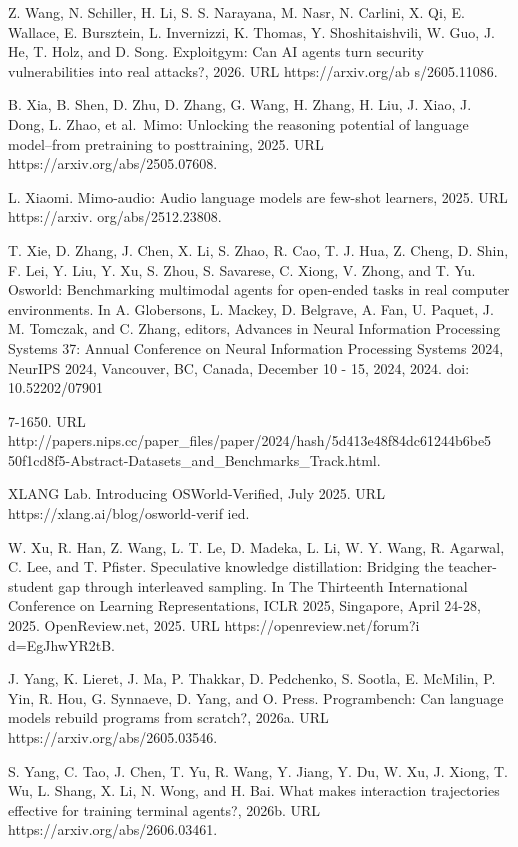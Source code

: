 \documentclass[
  10
]{article}
\begin{document}
Z. Wang, N. Schiller, H. Li, S. S. Narayana, M. Nasr, N. Carlini, X. Qi,
E. Wallace, E. Bursztein, L. Invernizzi, K. Thomas, Y. Shoshitaishvili,
W. Guo, J. He, T. Holz, and D. Song. Exploitgym: Can AI agents turn
security vulnerabilities into real attacks?, 2026. URL
https://arxiv.org/ab s/2605.11086.

B. Xia, B. Shen, D. Zhu, D. Zhang, G. Wang, H. Zhang, H. Liu, J. Xiao,
J. Dong, L. Zhao, et al.~Mimo: Unlocking the reasoning potential of
language model--from pretraining to posttraining, 2025. URL
https://arxiv.org/abs/2505.07608.

L. Xiaomi. Mimo-audio: Audio language models are few-shot learners,
2025. URL https://arxiv. org/abs/2512.23808.

T. Xie, D. Zhang, J. Chen, X. Li, S. Zhao, R. Cao, T. J. Hua, Z. Cheng,
D. Shin, F. Lei, Y. Liu, Y. Xu, S. Zhou, S. Savarese, C. Xiong, V.
Zhong, and T. Yu. Osworld: Benchmarking multimodal agents for open-ended
tasks in real computer environments. In A. Globersons, L. Mackey, D.
Belgrave, A. Fan, U. Paquet, J. M. Tomczak, and C. Zhang, editors,
Advances in Neural Information Processing Systems 37: Annual Conference
on Neural Information Processing Systems 2024, NeurIPS 2024, Vancouver,
BC, Canada, December 10 - 15, 2024, 2024. doi: 10.52202/07901



7-1650. URL
http://papers.nips.cc/paper\_files/paper/2024/hash/5d413e48f84dc61244b6be5
50f1cd8f5-Abstract-Datasets\_and\_Benchmarks\_Track.html.

XLANG Lab. Introducing OSWorld-Verified, July 2025. URL
https://xlang.ai/blog/osworld-verif ied.

W. Xu, R. Han, Z. Wang, L. T. Le, D. Madeka, L. Li, W. Y. Wang, R.
Agarwal, C. Lee, and T. Pfister. Speculative knowledge distillation:
Bridging the teacher-student gap through interleaved sampling. In The
Thirteenth International Conference on Learning Representations, ICLR
2025, Singapore, April 24-28, 2025. OpenReview.net, 2025. URL
https://openreview.net/forum?i d=EgJhwYR2tB.

J. Yang, K. Lieret, J. Ma, P. Thakkar, D. Pedchenko, S. Sootla, E.
McMilin, P. Yin, R. Hou, G. Synnaeve, D. Yang, and O. Press.
Programbench: Can language models rebuild programs from scratch?, 2026a.
URL https://arxiv.org/abs/2605.03546.

S. Yang, C. Tao, J. Chen, T. Yu, R. Wang, Y. Jiang, Y. Du, W. Xu, J.
Xiong, T. Wu, L. Shang, X. Li, N. Wong, and H. Bai. What makes
interaction trajectories effective for training terminal agents?, 2026b.
URL https://arxiv.org/abs/2606.03461.
\end{document}
